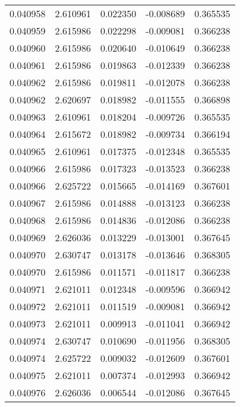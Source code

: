 \begin{tabular}{lrrrr}
0.040958    &  2.610961 &  0.022350 & -0.008689 &             0.365535 \\
0.040959    &  2.615986 &  0.022298 & -0.009081 &             0.366238 \\
0.040960    &  2.615986 &  0.020640 & -0.010649 &             0.366238 \\
0.040961    &  2.615986 &  0.019863 & -0.012339 &             0.366238 \\
0.040962    &  2.615986 &  0.019811 & -0.012078 &             0.366238 \\
0.040962    &  2.620697 &  0.018982 & -0.011555 &             0.366898 \\
0.040963    &  2.610961 &  0.018204 & -0.009726 &             0.365535 \\
0.040964    &  2.615672 &  0.018982 & -0.009734 &             0.366194 \\
0.040965    &  2.610961 &  0.017375 & -0.012348 &             0.365535 \\
0.040966    &  2.615986 &  0.017323 & -0.013523 &             0.366238 \\
0.040966    &  2.625722 &  0.015665 & -0.014169 &             0.367601 \\
0.040967    &  2.615986 &  0.014888 & -0.013123 &             0.366238 \\
0.040968    &  2.615986 &  0.014836 & -0.012086 &             0.366238 \\
0.040969    &  2.626036 &  0.013229 & -0.013001 &             0.367645 \\
0.040970    &  2.630747 &  0.013178 & -0.013646 &             0.368305 \\
0.040970    &  2.615986 &  0.011571 & -0.011817 &             0.366238 \\
0.040971    &  2.621011 &  0.012348 & -0.009596 &             0.366942 \\
0.040972    &  2.621011 &  0.011519 & -0.009081 &             0.366942 \\
0.040973    &  2.621011 &  0.009913 & -0.011041 &             0.366942 \\
0.040974    &  2.630747 &  0.010690 & -0.011956 &             0.368305 \\
0.040974    &  2.625722 &  0.009032 & -0.012609 &             0.367601 \\
0.040975    &  2.621011 &  0.007374 & -0.012993 &             0.366942 \\
0.040976    &  2.626036 &  0.006544 & -0.012086 &             0.367645 \\

\end{tabular}
